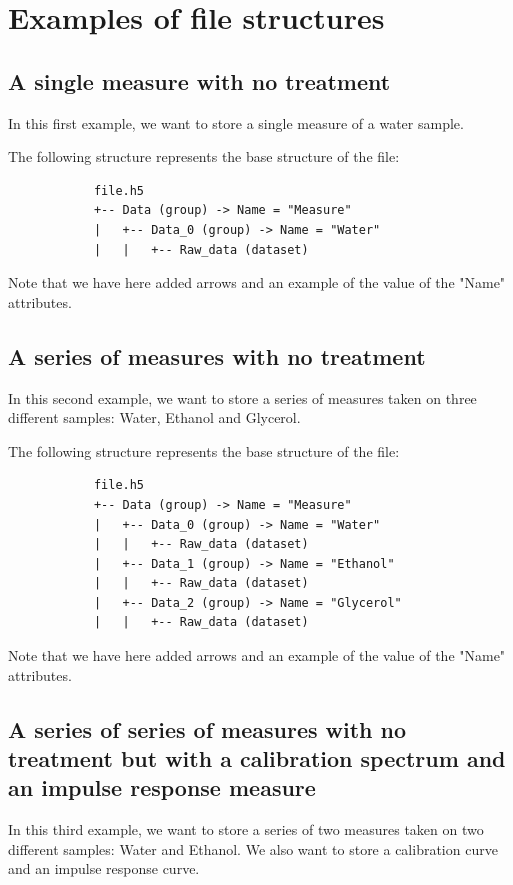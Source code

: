 \documentclass{book}
\begin{document}
\chapter{Examples of file structures}
        
    \section{A single measure with no treatment}
        In this first example, we want to store a single measure of a water sample.
    
        The following structure represents the base structure of the file:
        \begin{verbatim}
            file.h5
            +-- Data (group) -> Name = "Measure"
            |   +-- Data_0 (group) -> Name = "Water"
            |   |   +-- Raw_data (dataset)
        \end{verbatim}
        Note that we have here added arrows and an example of the value of the "Name" attributes.
    
    \section{A series of measures with no treatment}
        In this second example, we want to store a series of measures taken on three different samples: Water, Ethanol and Glycerol.

        The following structure represents the base structure of the file:
        \begin{verbatim}
            file.h5
            +-- Data (group) -> Name = "Measure"
            |   +-- Data_0 (group) -> Name = "Water"
            |   |   +-- Raw_data (dataset)
            |   +-- Data_1 (group) -> Name = "Ethanol"
            |   |   +-- Raw_data (dataset)
            |   +-- Data_2 (group) -> Name = "Glycerol"
            |   |   +-- Raw_data (dataset)
        \end{verbatim}
        Note that we have here added arrows and an example of the value of the "Name" attributes.
    
    \section{A series of series of measures with no treatment but with a calibration spectrum and an impulse response measure}
        In this third example, we want to store a series of two measures taken on two different samples: Water and Ethanol. We also want to store a calibration curve and an impulse response curve.
\end{document}
